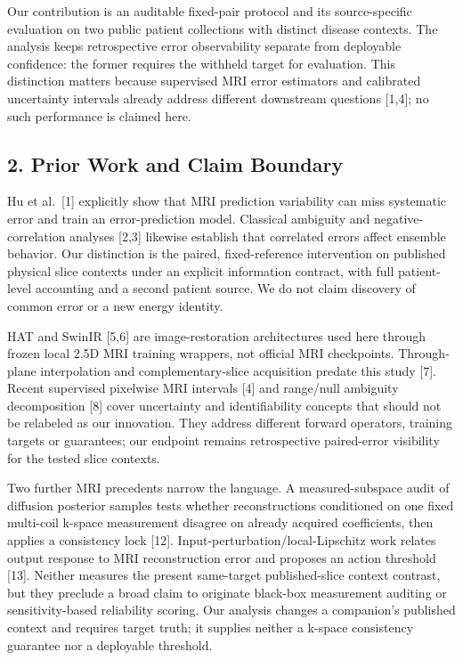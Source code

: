 \documentclass[
]{article}
\begin{document}
Our contribution is an auditable fixed-pair protocol and its
source-specific evaluation on two public patient collections with
distinct disease contexts. The analysis keeps retrospective error
observability separate from deployable confidence: the former requires
the withheld target for evaluation. This distinction matters because
supervised MRI error estimators and calibrated uncertainty intervals
already address different downstream questions {[}1,4{]}; no such
performance is claimed here.

\subsection{2. Prior Work and Claim
Boundary}\label{prior-work-and-claim-boundary}

Hu et al.~{[}1{]} explicitly show that MRI prediction variability can
miss systematic error and train an error-prediction model. Classical
ambiguity and negative-correlation analyses {[}2,3{]} likewise establish
that correlated errors affect ensemble behavior. Our distinction is the
paired, fixed-reference intervention on published physical slice
contexts under an explicit information contract, with full patient-level
accounting and a second patient source. We do not claim discovery of
common error or a new energy identity.

HAT and SwinIR {[}5,6{]} are image-restoration architectures used here
through frozen local 2.5D MRI training wrappers, not official MRI
checkpoints. Through-plane interpolation and complementary-slice
acquisition predate this study {[}7{]}. Recent supervised pixelwise MRI
intervals {[}4{]} and range/null ambiguity decomposition {[}8{]} cover
uncertainty and identifiability concepts that should not be relabeled as
our innovation. They address different forward operators, training
targets or guarantees; our endpoint remains retrospective paired-error
visibility for the tested slice contexts.

Two further MRI precedents narrow the language. A measured-subspace audit
of diffusion posterior samples tests whether reconstructions conditioned
on one fixed multi-coil k-space measurement disagree on already acquired
coefficients, then applies a consistency lock {[}12{]}.
Input-perturbation/local-Lipschitz work relates output response to MRI
reconstruction error and proposes an action threshold {[}13{]}. Neither
measures the present same-target published-slice context contrast, but
they preclude a broad claim to originate black-box measurement auditing
or sensitivity-based reliability scoring. Our analysis changes a
companion's published context and requires target truth; it supplies
neither a k-space consistency guarantee nor a deployable threshold.
\end{document}

